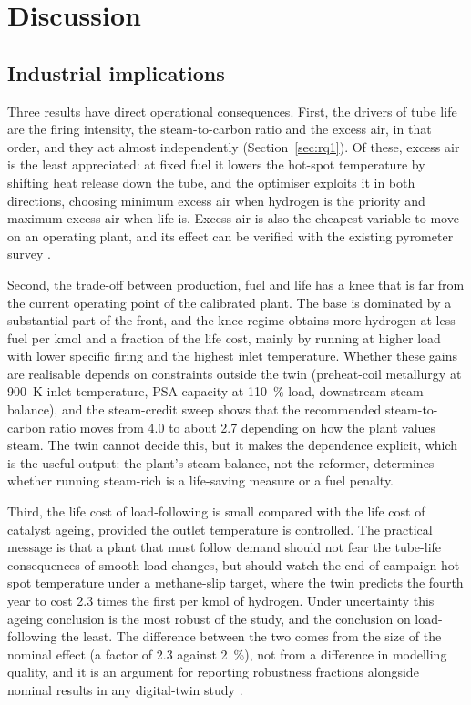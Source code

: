 \section{Discussion}
\label{sec:discussion}

\subsection{Industrial implications}

Three results have direct operational consequences. First, the drivers of tube life are the firing intensity, the steam-to-carbon
ratio and the excess air, in that order, and they act almost independently (Section~\ref{sec:rq1}). Of these, excess air is the
least appreciated: at fixed fuel it lowers the hot-spot temperature by shifting heat release down the tube, and the optimiser
exploits it in both directions, choosing minimum excess air when hydrogen is the priority and maximum excess air when life is. Excess
air is also the cheapest variable to move on an operating plant, and its effect can be verified with the existing pyrometer
survey .

Second, the trade-off between production, fuel and life has a knee that is far from the current operating point of the
calibrated plant. The base is dominated by a substantial part of the front, and the knee regime obtains more hydrogen at less fuel
per kmol and a fraction of the life cost, mainly by running at higher load with lower specific firing and the highest inlet
temperature. Whether these gains are realisable depends on constraints outside the twin (preheat-coil metallurgy at \SI{900}{K}
inlet temperature, PSA capacity at \SI{110}{\percent} load, downstream steam balance), and the steam-credit sweep shows that the
recommended steam-to-carbon ratio moves from 4.0 to about 2.7 depending on how the plant values steam. The twin cannot decide this,
but it makes the dependence explicit, which is the useful output: the plant's steam balance, not the reformer, determines whether
running steam-rich is a life-saving measure or a fuel penalty.

Third, the life cost of load-following is small compared with the life cost of catalyst ageing, provided the outlet temperature is
controlled. The practical message is that a plant that must follow demand should not fear the tube-life consequences of smooth load
changes, but should watch the end-of-campaign hot-spot temperature under a methane-slip target, where the twin predicts the fourth
year to cost 2.3 times the first per kmol of hydrogen. Under uncertainty this ageing conclusion is the most robust of the study,
and the conclusion on load-following the least. The difference between the two comes from the size of the nominal effect
(a factor of 2.3 against \SI{2}{\percent}), not from a difference in modelling quality, and it is an argument for reporting
robustness fractions alongside nominal results in any digital-twin study .

